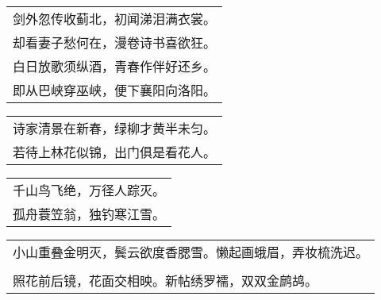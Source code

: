 \nopagebreak%
\nopagebreak%
\noindent\begin{minipage}{\linewidth}
  \vskip-3pt\begin{table}[H]
    \centering
    \begin{tabular}{@{}l@{}}
剑外忽传收蓟北，初闻涕泪满衣裳。\\
却看妻子愁何在，漫卷诗书喜欲狂。\\
白日放歌须纵酒，青春作伴好还乡。\\
即从巴峡穿巫峡，便下襄阳向洛阳。
    \end{tabular}
  \end{table}
\end{minipage}
\vspace{1cm}


\nopagebreak%
\nopagebreak%
\noindent\begin{minipage}{\linewidth}
  \vskip-3pt\begin{table}[H]
    \centering
    \begin{tabular}{@{}l@{}}
诗家清景在新春，绿柳才黄半未匀。\\
若待上林花似锦，出门俱是看花人。
    \end{tabular}
  \end{table}
\end{minipage}
\vspace{1cm}


\nopagebreak%
\nopagebreak%
\noindent\begin{minipage}{\linewidth}
  \vskip-3pt\begin{table}[H]
    \centering
    \begin{tabular}{@{}l@{}}
千山鸟飞绝，万径人踪灭。\\
孤舟蓑笠翁，独钓寒江雪。
    \end{tabular}
  \end{table}
\end{minipage}
\vspace{1cm}


\nopagebreak%
\nopagebreak%
\noindent\begin{minipage}{\linewidth}
  \vskip-3pt\begin{table}[H]
    \centering
    \begin{tabular}{@{}l@{}}
小山重叠金明灭，鬓云欲度香腮雪。懒起画蛾眉，弄妆梳洗迟。\\
\\
照花前后镜，花面交相映。新帖绣罗襦，双双金鹧鸪。
    \end{tabular}
  \end{table}
\end{minipage}
\vspace{1cm}


